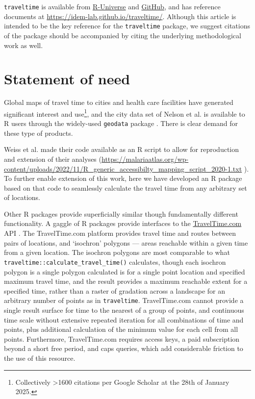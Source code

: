 \documentclass[
  10pt,
  letterpaper,
]{article}
\begin{document}
\texttt{traveltime} is available from
\href{https://idem-lab.r-universe.dev/traveltime}{R-Universe} and
\href{https://github.com/idem-lab/traveltime}{GitHub}, and has reference
documents at \url{https://idem-lab.github.io/traveltime/}. Although this
article is intended to be the key reference for the \texttt{traveltime}
package, we suggest citations of the package should be accompanied by
citing the underlying methodological work
\citep{weiss2018global, weiss2020global} as well.

\section{Statement of need}\label{statement-of-need}

Global maps of travel time to cities
\citep{weiss2018global, nelson2019suite} and health care facilities
\citep{hulland2019travel, weiss2020global} have generated significant
interest and use\footnote{Collectively \textgreater1600 citations per
  Google Scholar at the 28th of January 2025.}, and the city data set of
Nelson et al. \citep{nelson2019suite} is available to R users through
the widely-used \texttt{geodata} package \citep{geodata}. There is clear
demand for these type of products.

Weiss et al. \citep{weiss2020global} made their code available as an R
script to allow for reproduction and extension of their analyses
(\url{https://malariaatlas.org/wp-content/uploads/2022/11/R_generic_accessibilty_mapping_script_2020-1.txt}
). To further enable extension of this work, here we have developed an R
package based on that code to seamlessly calculate the travel time from
any arbitrary set of locations.

Other R packages provide superficially similar though fundamentally
different functionality. A gaggle of R packages provide interfaces to
the \href{https://www.TravelTime.com}{TravelTime.com} API
\citep{traveltimeapi, traveltimeR, rtraveltime, traveltime_gh}. The
TravelTime.com platform provides travel time and routes between pairs of
locations, and `isochron' polygons --- areas reachable within a given
time from a given location. The isochron polygons are most comparable to
what \texttt{traveltime::calculate\_travel\_time()} calculates, though
each isochron polygon is a single polygon calculated is for a single
point location and specified maximum travel time, and the result
provides a maximum reachable extent for a specified time, rather than a
raster of gradation across a landscape for an arbitrary number of points
as in \texttt{traveltime}. TravelTime.com cannot provide a single result
surface for time to the nearest of a group of points, and continuous
time scale without extensive repeated iteration for all combinations of
time and points, plus additional calculation of the minimum value for
each cell from all points. Furthermore, TravelTime.com requires access
keys, a paid subscription beyond a short free period, and caps queries,
which add considerable friction to the use of this resource.
\end{document}
